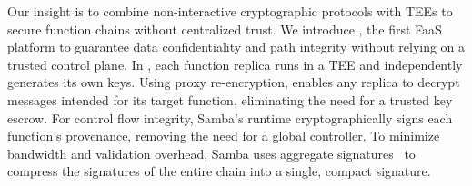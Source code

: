 %
Our insight is to combine non-interactive cryptographic protocols with
TEEs to secure function chains without centralized trust.
%
We introduce \SystemName, the first FaaS platform to guarantee data
confidentiality and path integrity without relying on a trusted control plane.
%
In \SystemName, each function replica runs in a TEE and independently generates its own keys.
%
Using proxy re-encryption, \SystemName enables any replica to decrypt
messages intended for its target function, eliminating the need for a trusted
key escrow.
%
For control flow integrity, Samba's runtime cryptographically signs each
function's provenance, removing the need for a global controller.
%
To minimize bandwidth and validation overhead, Samba uses aggregate
signatures~\cite{03-eurocrypt-aggregate_signatures_bilinear_maps} to compress
the signatures of the entire chain into a single, compact signature.





